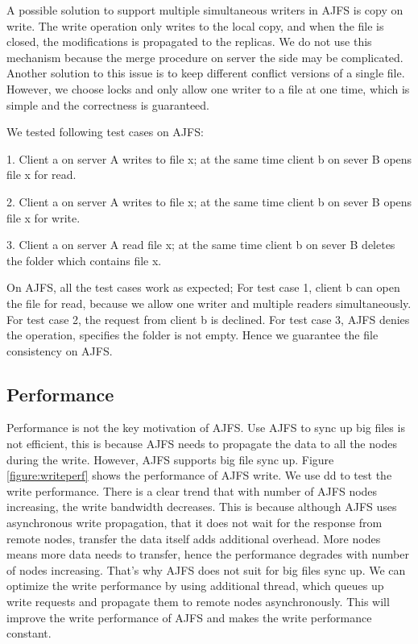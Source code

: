 A possible solution to support multiple simultaneous writers in AJFS is copy on write. The write operation only writes to the local copy, and when the file is closed, the modifications is propagated to the replicas. We do not use this mechanism because the merge procedure on server the side may be complicated. Another solution to this issue is to keep different conflict versions of a single file. 
However, we choose locks and only allow one writer to a file at one time, which is simple and the correctness is guaranteed.

We tested following test cases on AJFS:

1. Client a on server A writes to file x; at the same time client b on sever B opens file x for read.

2. Client a on server A writes to file x; at the same time client b on sever B opens file x for write.

3. Client a on server A read file x; at the same time client b on sever B deletes the folder which contains file x.

On AJFS, all the test cases work as expected; For test case 1, client b can open the file for read, because we allow one writer and multiple readers simultaneously. For test case 2, the request from client b is declined. For test case 3, AJFS denies the operation, specifies the folder is not empty. Hence we guarantee the file consistency on AJFS.

\subsection{Performance}

Performance is not the key motivation of AJFS. Use AJFS to sync up big files is not efficient, this is because AJFS needs to propagate the data to all the nodes during the write.
However, AJFS supports big file sync up.
Figure \ref{figure:writeperf} shows the performance of AJFS write. 
We use dd to test the write performance. There is a clear trend that with number of AJFS nodes increasing,
the write bandwidth decreases. This is because although AJFS uses asynchronous write propagation, that it does not wait for the response from remote nodes,
transfer the data itself adds additional overhead. 
More nodes means more data needs to transfer, hence the performance degrades with number of nodes increasing.
That's why AJFS does not suit for big files sync up.
We can optimize the write performance by using additional thread, which queues up write requests and propagate them to remote nodes asynchronously.
This will improve the write performance of AJFS and makes the write performance constant.

